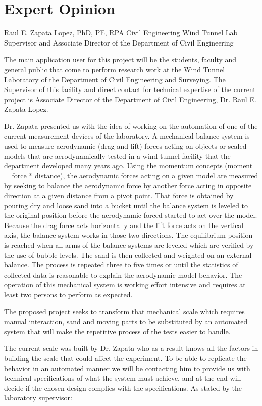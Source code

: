 \section{Expert Opinion}

Raul E. Zapata Lopez, PhD, PE, RPA
	Civil Engineering Wind Tunnel Lab Supervisor and
	Associate Director of the Department of Civil Engineering

	The main application user for this project will be the students, faculty and general public that come to perform research work at the Wind Tunnel Laboratory of the Department of Civil Engineering and Surveying. The Supervisor of this facility and direct contact for technical expertise of the current project is Associate Director of the Department of Civil Engineering, Dr. Raul E. Zapata-Lopez. 
	
	Dr. Zapata presented us with the idea of working on the automation of one of the current measurement 
	devices of the laboratory. A mechanical balance system is used to measure aerodynamic (drag and lift) forces acting on objects or scaled models that are aerodynamically tested in a wind tunnel facility that the department developed many years ago. Using the momentum concepts (moment = force * distance), the aerodynamic forces acting on a given model are measured by seeking to balance the aerodynamic force by another force acting in opposite direction at a given distance from a pivot point. That force is obtained by pouring dry and loose sand into a bucket until the balance system is leveled to the original position before the aerodynamic forced started to act over the model. Because the drag force acts horizontally and the lift force acts on the vertical axis, the balance system works in those two directions. The equilibrium position is reached when all arms of the balance systems are leveled which are verified by the use of bubble levels. The sand is then collected and weighted on an external balance. The process is repeated three to five times or until the statistics of collected data is reasonable to explain the aerodynamic model behavior. The operation of this mechanical system is working effort intensive and requires at least two persons to perform as expected. 

	The proposed project seeks to transform that mechanical scale which requires manual interaction, sand and moving parts to be substituted by an automated system that will make the repetitive process of the tests easier to handle. 

	The current scale was built by Dr. Zapata who as a result knows all the factors in building the scale that could affect the experiment. To be able to replicate the behavior in an automated manner we will be contacting him to provide us with technical specifications of what the system must achieve, and at the end will decide if the chosen design complies with the specifications. As stated by the laboratory supervisor:

